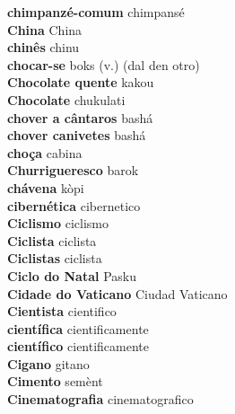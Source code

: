 \textbf{ chimpanzé-comum  } chimpansé \\
\textbf{ China  } China \\
\textbf{ chinês  } chinu \\
\textbf{ chocar-se  } boks (v.) (dal den otro) \\
\textbf{ Chocolate quente  } kakou \\
\textbf{ Chocolate  } chukulati \\
\textbf{ chover a cântaros  } bashá \\
\textbf{ chover canivetes  } bashá \\
\textbf{ choça  } cabina \\
\textbf{ Churrigueresco  } barok \\
\textbf{ chávena  } kòpi \\
\textbf{ cibernética  } cibernetico \\
\textbf{ Ciclismo  } ciclismo \\
\textbf{ Ciclista  } ciclista \\
\textbf{ Ciclistas  } ciclista \\
\textbf{ Ciclo do Natal  } Pasku \\
\textbf{ Cidade do Vaticano  } Ciudad Vaticano \\
\textbf{ Cientista  } cientifico \\
\textbf{ científica  } cientificamente \\
\textbf{ científico  } cientificamente \\
\textbf{ Cigano  } gitano \\
\textbf{ Cimento  } semènt \\
\textbf{ Cinematografia  } cinematografico \\
